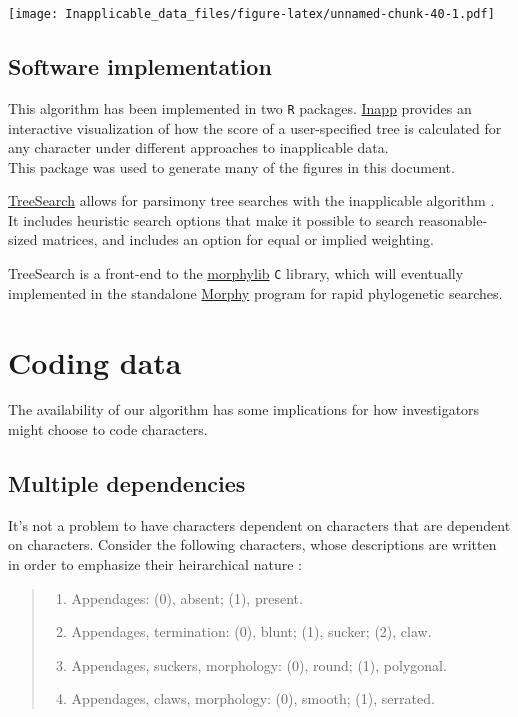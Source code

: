 \documentclass[]{book}
\theoremstyle{definition}
\theoremstyle{definition}
\theoremstyle{definition}
\theoremstyle{remark}
\begin{document}
\texttt{[image: Inapplicable\_data\_files/figure-latex/unnamed-chunk-40-1.pdf]}

\hypertarget{software}{%
\section{Software implementation}\label{software}}

This algorithm has been implemented in two \texttt{R} packages.
\href{https://github.com/TGuillerme/Inapp}{Inapp} provides an
interactive visualization of how the score of a user-specified tree is
calculated for any character under different approaches to inapplicable
data.\\
This package was used to generate many of the figures in this document.

\href{https://github.com/ms609/TreeSearch}{TreeSearch} allows for
parsimony tree searches with the inapplicable algorithm
\citep{ThisStudy}.\\
It includes heuristic search options that make it possible to search
reasonable-sized matrices, and includes an option for equal or implied
weighting.

TreeSearch is a front-end to the
\href{https://github.com/mbrazeau/morphylib}{morphylib} \texttt{C}
library, which will eventually implemented in the standalone
\href{http://www.morphyproject.org/}{Morphy} program for rapid
phylogenetic searches.

\hypertarget{coding}{%
\chapter{Coding data}\label{coding}}

The availability of our algorithm has some implications for how
investigators might choose to code characters.

\hypertarget{multiple-dependencies}{%
\section{Multiple dependencies}\label{multiple-dependencies}}

It's not a problem to have characters dependent on characters that are
dependent on characters. Consider the following characters, whose
descriptions are written in order to emphasize their heirarchical nature
\citep[following the recommendations of][]{Sereno2007}:

\begin{quote}
\begin{enumerate}
\def\labelenumi{\arabic{enumi}.}
\item
  Appendages: (0), absent; (1), present.
\item
  Appendages, termination: (0), blunt; (1), sucker; (2), claw.
\item
  Appendages, suckers, morphology: (0), round; (1), polygonal.
\item
  Appendages, claws, morphology: (0), smooth; (1), serrated.
\end{enumerate}
\end{quote}
\end{document}
